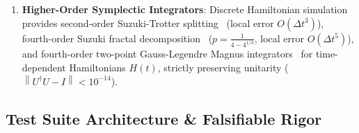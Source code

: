 \documentclass[aps,prx,twocolumn,superscriptaddress,nofootinbib]{revtex4-2}
\newcommand{\ket}[1]{|#1\rangle}
\newcommand{\norm}[1]{\left\|#1\right\|}
\newcommand{\Tr}{\operatorname{Tr}}
\begin{document}
\begin{enumerate}
    \begin{equation}
        \frac{d\rho}{dt} = -i [H, \rho] + \sum_k \left( L_k \rho L_k^\dagger - \frac{1}{2} \{ L_k^\dagger L_k, \rho \} \right),
    \end{equation}
    the vectorized Liouvillian superoperator:
    \begin{align}
        \mathcal{L} = -i (I \otimes H - H^T \otimes I) + \sum_k \Bigl( L_k^* \otimes L_k &- \frac{1}{2} I \otimes L_k^\dagger L_k \nonumber \\
        &- \frac{1}{2} (L_k^\dagger L_k)^T \otimes I \Bigr)
    \end{align}
    preserves unit trace throughout time trajectories ($|\Tr(\rho(t)) - 1.0| < 10^{-10}$) and computes steady states $\mathcal{L} \ket{\rho_{\text{ss}}}\rangle = 0$ via null-space least squares.
    \item \textbf{Higher-Order Symplectic Integrators}: Discrete Hamiltonian simulation provides second-order Suzuki-Trotter splitting~\cite{trotter1959product} (local error $O(\Delta t^3)$), fourth-order Suzuki fractal decomposition~\cite{suzuki1990fractal} ($p = \frac{1}{4 - 4^{1/3}}$, local error $O(\Delta t^5)$), and fourth-order two-point Gauss-Legendre Magnus integrators~\cite{magnus1954exponential} for time-dependent Hamiltonians $H(t)$, strictly preserving unitarity ($\norm{U^\dagger U - I} < 10^{-14}$).
\end{enumerate}

\subsection{Test Suite Architecture & Falsifiable Rigor}
\label{subsec:test_suite}
\end{document}
